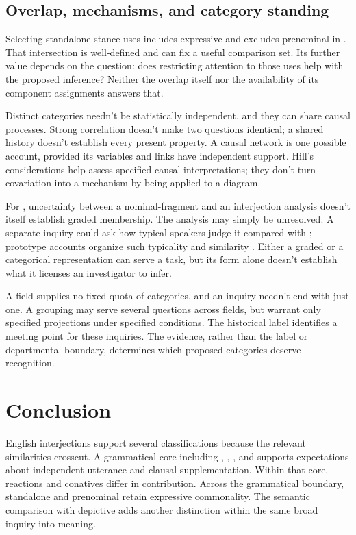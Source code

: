 \documentclass[12pt]{article}
\begin{document}
\subsection{Overlap, mechanisms, and category standing}

Selecting standalone stance uses includes expressive 
and excludes prenominal  in . That
intersection is well-defined and can fix a useful comparison set.
Its further value depends on the question: does restricting attention
to those uses help with the proposed inference? Neither the overlap
itself nor the availability of its component assignments answers that.

Distinct categories needn't be statistically independent, and they can
share causal processes. Strong correlation doesn't make two questions
identical; a shared history doesn't establish every present property.
A causal network is one possible account, provided its variables and
links have independent support. Hill's considerations help assess
specified causal interpretations; they don't turn covariation into
a mechanism by being applied to a diagram.

For , uncertainty between a nominal-fragment and an
interjection analysis doesn't itself establish graded membership. The
analysis may simply be unresolved. A separate inquiry could ask how
typical speakers judge it compared with ; prototype
accounts organize such typicality and similarity \citep{rosch1975,taylor2003}.
Either a graded or a categorical representation can serve a task,
but its form alone doesn't establish what it licenses an investigator
to infer.

A field supplies no fixed quota of categories, and an inquiry
needn't end with just one. A grouping may serve several questions across
fields, but warrant only specified projections under specified conditions.
The historical label  identifies a meeting point for
these inquiries. The evidence, rather than the label or departmental
boundary, determines which proposed categories deserve recognition.

\section{Conclusion}\label{sec:conclusion}

English interjections support several classifications because the relevant
similarities crosscut. A grammatical core including ,
, , and  supports expectations about
independent utterance and clausal supplementation. Within that core,
reactions and conatives differ in contribution. Across the grammatical boundary,
standalone and prenominal  retain expressive commonality.
The semantic comparison with depictive  adds another
distinction within the same broad inquiry into meaning.
\end{document}
